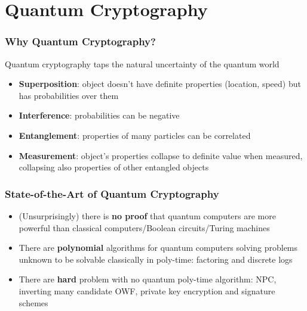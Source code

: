 \section{Quantum Cryptography}
\begin{frame}\frametitle{Why Quantum Cryptography?}
Quantum cryptography taps the natural uncertainty of the quantum world
\begin{itemize}
\item \textbf{Superposition}: object doesn't have definite properties (location, speed) but has probabilities over them
\item \textbf{Interference}: probabilities can be negative
\item \textbf{Entanglement}: properties of many particles can be correlated
\item \textbf{Measurement}: object's properties collapse to definite value when measured, collapsing also properties of other entangled objects
\end{itemize}
\end{frame}
\begin{frame}\frametitle{State-of-the-Art of Quantum Cryptography}
\begin{itemize}
\item (Unsurprisingly) there is \textbf{no proof} that quantum computers are more powerful than classical computers/Boolean circuits/Turing machines
\item There are \textbf{polynomial} algorithms for quantum computers solving problems unknown to be solvable classically in poly-time: factoring and discrete logs
\item There are \textbf{hard} problem with no quantum poly-time algorithm: NPC, inverting many candidate OWF, private key encryption and signature schemes
\end{itemize}
\end{frame}
